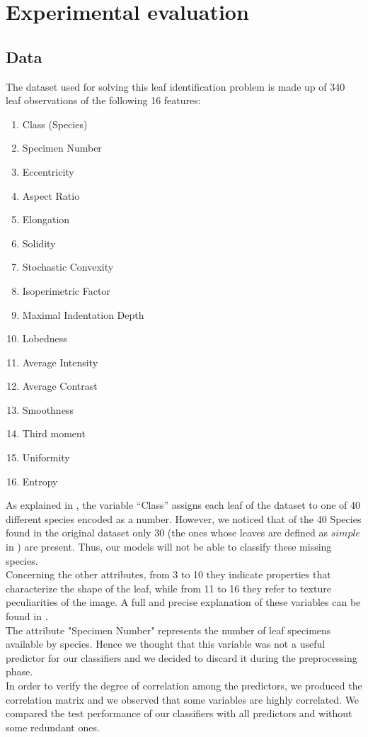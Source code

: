 \documentclass{article}
\begin{document}
\section{Experimental evaluation}

\subsection{Data}\label{dat}
The dataset used for solving this leaf identification problem is made up of 340 leaf observations of the following 16 features:
\begin{multicols}{3}
	\begin{enumerate}
		\item Class (Species)
		\item Specimen Number
		\item Eccentricity
		\item Aspect Ratio
		\item Elongation
		\item Solidity
		\item Stochastic Convexity
		\item Isoperimetric Factor
		\item Maximal Indentation Depth
		\item Lobedness
		\item Average Intensity
		\item Average Contrast
		\item Smoothness
		\item Third moment
		\item Uniformity
		\item Entropy
	\end{enumerate}
\end{multicols}
\noindent As explained in \cite{silva}, the variable “Class”  assigns each leaf of the dataset to one of $40$ different species encoded as a number. However, we noticed that  of the 40 Species found in the original dataset only 30 (the ones whose leaves are defined as $\textit{simple}$ in \cite{silva}) are present.
Thus, our models will not be able to classify these missing species.
\\ Concerning the other attributes, from 3 to 10 they indicate properties that characterize the shape of the leaf, while from 11 to 16 they refer to texture peculiarities of the image. A full and precise explanation of these variables can be found in \cite{silva}.
\\The attribute "Specimen Number" represents the number of leaf specimens available by species. Hence we thought that this variable was not a useful predictor for our classifiers and we decided to discard it during the preprocessing phase.
\\In order to verify the degree of correlation among the predictors, we produced the correlation matrix and we observed that some variables are highly correlated. We compared the test performance of our classifiers with all predictors and without some redundant ones.
\end{document}
